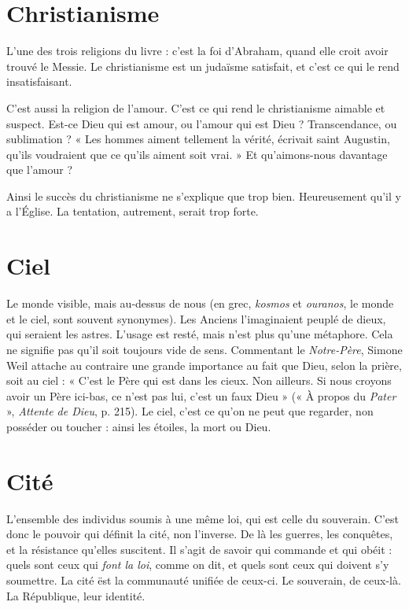\section{Christianisme}
L’une des trois religions du livre : c’est la foi d'Abraham,
quand elle croit avoir trouvé le Messie. Le christianisme
est un judaïsme satisfait, et c’est ce qui le rend insatisfaisant.

C’est aussi la religion de l’amour. C’est ce qui rend le christianisme aimable
et suspect. Est-ce Dieu qui est amour, ou l'amour qui est Dieu ? Transcendance,
ou sublimation ? « Les hommes aiment tellement la vérité, écrivait saint
Augustin, qu’ils voudraient que ce qu’ils aiment soit vrai. » Et qu’aimons-nous
davantage que l'amour ?

Ainsi le succès du christianisme ne s’explique que trop bien. Heureusement
qu’il y a l’Église. La tentation, autrement, serait trop forte.

\section{Ciel}
Le monde visible, mais au-dessus de nous (en grec, {\it kosmos} et {\it ouranos},
le monde et le ciel, sont souvent synonymes). Les Anciens l'imaginaient
peuplé de dieux, qui seraient les astres. L’usage est resté, mais n’est plus
qu'une métaphore. Cela ne signifie pas qu’il soit toujours vide de sens. Commentant
le {\it Notre-Père}, Simone Weil attache au contraire une grande importance
au fait que Dieu, selon la prière, soit au ciel : « C’est le Père qui est dans
les cieux. Non ailleurs. Si nous croyons avoir un Père ici-bas, ce n’est pas lui,
c'est un faux Dieu » (« À propos du {\it Pater} », {\it Attente de Dieu}, p. 215). Le ciel,
c’est ce qu’on ne peut que regarder, non posséder ou toucher : ainsi les étoiles,
la mort ou Dieu.

\section{Cité}
L'ensemble des individus soumis à une même loi, qui est celle du
souverain. C’est donc le pouvoir qui définit la cité, non l’inverse. De
là les guerres, les conquêtes, et la résistance qu’elles suscitent. Il s’agit de savoir
qui commande et qui obéit : quels sont ceux qui {\it font la loi}, comme on dit, et
quels sont ceux qui doivent s’y soumettre. La cité ëst la communauté unifiée de
ceux-ci. Le souverain, de ceux-là. La République, leur identité.

